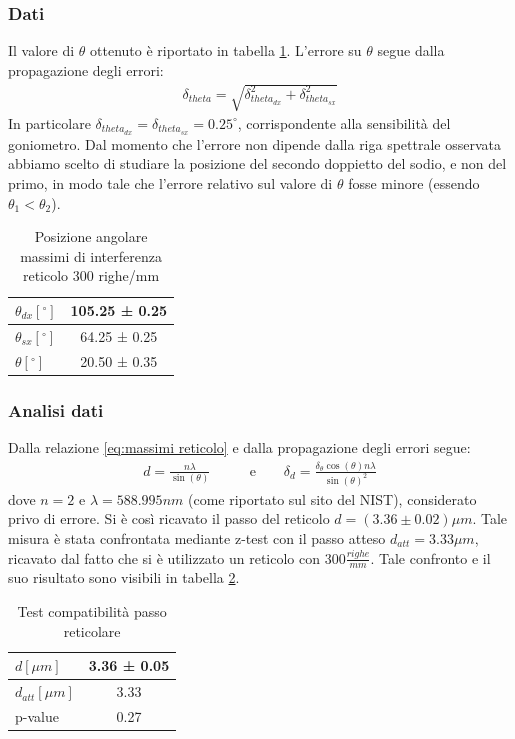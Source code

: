 \documentclass[a4paper]{article}
\begin{document}
\subsubsection{Dati}
Il valore di $\theta$ ottenuto è riportato in tabella \ref{tab:angoli_d}. L'errore su $\theta$ segue dalla propagazione degli errori:
\begin{align}
\delta_{theta} = \sqrt{\delta_{theta_{dx}}^2+\delta_{theta_{sx}}^2}
\label{eq:err_angolo}
\end{align}
In particolare $\delta_{theta_{dx}} =\delta_{theta_{sx}}= 0.25^\circ$, corrispondente alla sensibilità del goniometro.
Dal momento che l'errore non dipende dalla riga spettrale osservata abbiamo scelto di studiare la posizione del secondo doppietto del sodio, e non del primo, in modo tale che l'errore relativo sul valore di $\theta$ fosse minore (essendo $\theta_1 < \theta_2$).

\begin{table}[htbp]
\centering
\begin{tabular}{|l|c|}
\hline
$\theta_{dx} [^\circ]$ & 105.25 ± 0.25 \\\hline
$\theta_{sx} [^\circ]$ & 64.25 ± 0.25 \\\hline
$\theta [^\circ]$ & 20.50 ± 0.35  \\\hline
\end{tabular}
\caption{Posizione angolare massimi di interferenza reticolo 300 righe/mm}
\label{tab:angoli_d}
\end{table}

\subsubsection{Analisi dati}
Dalla relazione \ref{eq:massimi reticolo} e dalla propagazione degli errori segue:
\begin{align}
    d = \frac{n\lambda}{\sin(\theta)}  \qquad & \text{e} \qquad \delta_d = \frac{\delta_{\theta}\cos(\theta)n\lambda}{\sin(\theta)^2}
\label{eq:passo_reticolo}
\end{align}
dove $n=2$ e $\lambda=588.995 nm$ (come riportato sul sito del NIST), considerato privo di errore.
Si è così ricavato il passo del reticolo $d=(3.36 \pm0.02)\mu m$. Tale misura è stata confrontata mediante z-test con il passo atteso $d_{att}=3.33 \mu m$, ricavato dal fatto che si è utilizzato un reticolo con $300 \frac{righe}{mm}$. 
Tale confronto e il suo risultato sono visibili in tabella \ref{tab:passo_reticolo+compatibilità}.

\begin{table}[htbp]
\centering
\begin{tabular}{|l|c|}
\hline
$d[\mu m]$ & 3.36 ± 0.05 \\\hline
$d_{att} [\mu m]$ & 3.33 \\\hline
p-value &  0.27 \\\hline
\end{tabular}
\caption{Test compatibilità passo reticolare}
\label{tab:passo_reticolo+compatibilità}
\end{table}
\end{document}
